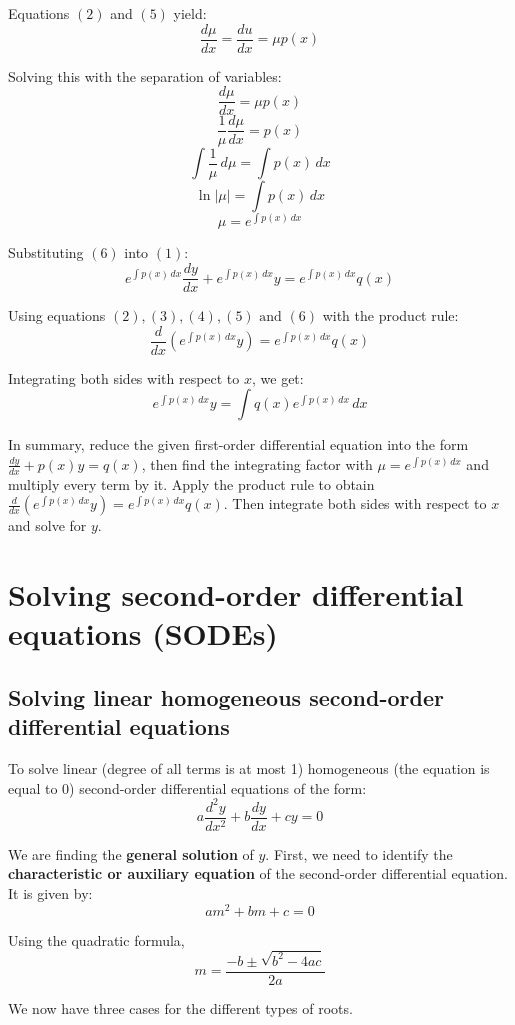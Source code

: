\documentclass[11pt]{article}
\begin{document}
Equations \((2)\) and \((5)\) yield:
\[\frac{d \mu}{dx} = \frac{du}{dx} = \mu p (x)\]

Solving this with the separation of variables:
\[\frac{d \mu}{dx} = \mu p(x)\]
\[\frac{1}{\mu} \frac{d \mu}{dx} = p(x)\]
\[\int \frac{1}{\mu} \, d \mu = \int p(x) \, dx\]
\[\ln |\mu| = \int p(x) \, dx\]
\[\mu = e^{\int p(x) \, dx} \tag{6}\]

Substituting \((6)\) into \((1)\):
\[e^{\int p(x) \, dx} \frac{dy}{dx} + e^{\int p(x) \, dx} y = e^{\int p(x) \, dx} q(x)\]

Using equations \((2), (3), (4), (5) \text{ and } (6)\) with the product rule:
\[\frac{d}{dx} \left( e^{\int p(x) \, dx} y \right) = e^{\int p(x) \, dx} q(x)\]

Integrating both sides with respect to \(x\), we get:
\[e^{\int p(x) \, dx} y = \int q(x) e^{\int p(x) \, dx} \, dx\]

In summary, reduce the given first-order differential equation into the form \(\frac{dy}{dx} + p(x) y = q(x)\), then find the integrating factor with \(\mu = e^{\int p(x) \, dx}\) and multiply every term by it. Apply the product rule to obtain \(\frac{d}{dx} \left( e^{\int p(x) \, dx} y \right) = e^{\int p(x) \, dx} q(x)\). Then integrate both sides with respect to \(x\) and solve for \(y\).


\section{Solving second-order differential equations (SODEs)}
\label{sec:orgd09cff9}

\subsection{Solving linear homogeneous second-order differential equations}
\label{sec:org4216556}
To solve linear (degree of all terms is at most 1) homogeneous (the equation is equal to 0) second-order differential equations of the form:
\[a \frac{d^2y}{dx^2} + b \frac{dy}{dx} + cy = 0\]

We are finding the \textbf{general solution} of \(y\). First, we need to identify the \textbf{characteristic or auxiliary equation} of the second-order differential equation. It is given by:
\[am^2 + bm + c = 0\]

Using the quadratic formula,
\[m = \frac{-b \pm \sqrt{b^2 - 4ac}}{2a}\]

We now have three cases for the different types of roots.
\end{document}
